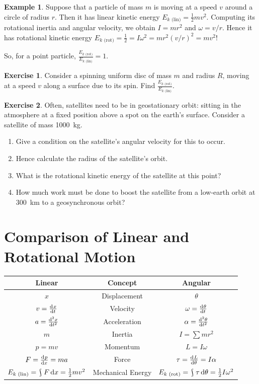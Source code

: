 \documentclass[a4paper]{amsbook}
\newcommand{\ekl}{E_{k \text{ (lin)}}}
\newcommand{\ekr}{E_{k \text{ (rot)}}}
\theoremstyle{definition}
\newtheorem*{example}{Example}
\newtheorem{exercise}{Exercise}
\numberwithin{exercise}{chapter}
\numberwithin{exercise}{chapter}
\DeclareMathOperator*{\rint}{\scalerel*{\rotatebox{17}{$\!\int\!$}}{\int}}
\begin{document}
\begin{example}
  Suppose that a particle of mass $ m $ is moving at a speed $ v $ around a circle of radius $ r $. Then it has linear kinetic
  energy $ \ekl = \frac{1}{2} mv^2 $. Computing its rotational inertia and angular velocity, we obtain $ I = mr^2 $ and $ \omega = v/r $.
  Hence it has rotational kinetic energy $ \ekr = \frac{1}{2} = I \omega^2 = mr^2 (v/r)^2 = mv^2 $!
\end{example}

So, for a point particle, $ \frac{\ekr}{\ekl} = 1 $.

\begin{exercise}
  Consider a spinning uniform disc of mass $ m $ and radius $ R $, moving at a speed $ v $ along a surface due to its spin. Find $ \frac{\ekr}{\ekl} $.
\end{exercise}

\begin{exercise}
  Often, satellites need to be in geostationary orbit: sitting in the atmosphere at a fixed position above a spot on the earth's
  surface. Consider a satellite of mass \SI{1000}{\kilo\gram}.
  \begin{enumerate}
    \item Give a condition on the satellite's angular velocity for this to occur.
    \item Hence calculate the radius of the satellite's orbit.
    \item What is the rotational kinetic energy of the satellite at this point?
    \item How much work must be done to boost the satellite from a low-earth orbit at \SI{300}{\kilo\metre} to a geosynchronous orbit?
  \end{enumerate}
\end{exercise}

\section{Comparison of Linear and Rotational Motion}
\begin{center}
  \def\arraystretch{1.5}
  \begin{tabular}{ccc}
    \textbf{Linear} & \textbf{Concept} & \textbf{Angular}\\\hline
    $ x $ & Displacement & $ \theta $\\\hline
    $ v = \od{x}{t} $ & Velocity & $ \omega = \od{\theta}{t} $\\\hline
    $ a = \od[2]{x}{t} $ & Acceleration & $ \alpha = \od[2]{\theta}{t} $\\\hline
    $ m $ & Inertia & $ I = \sum mr^2 $\\\hline
    $ p = mv $ & Momentum & $ L = I\omega $\\\hline
    $ F = \od{p}{x} = ma $ & Force & $ \tau = \od{L}{\theta} = I\alpha $\\\hline
    $ \ekl = \rint F \dif{x} = \frac{1}{2}mv^2 $ & Mechanical Energy & $ \ekr = \rint \tau \dif{\theta} = \frac{1}{2} I\omega^2 $\\\hline
  \end{tabular}
\end{center}
\end{document}
